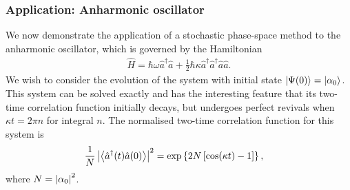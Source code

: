 
\subsubsection{Application: Anharmonic oscillator}

We now demonstrate the application of a stochastic phase-space method to the anharmonic oscillator, which is governed by the Hamiltonian
\begin{align}
    \hat{H} = \hbar \omega \hat{a}^\dagger \hat{a} + \frac{1}{2} \hbar \kappa \hat{a}^\dagger \hat{a}^\dagger \hat{a} \hat{a}. \label{BackgroundTheory:AnharmonicOscillator:Hamiltonian}
\end{align}
We wish to consider the evolution of the system with initial state ${\left|\Psi(0)\right>} = {\left|\alpha_0\right>}$.  This system can be solved exactly and has the interesting feature that its two-time correlation function initially decays, but undergoes perfect revivals when $\kappa t = 2 \pi n$ for integral $n$.  The normalised two-time correlation function for this system is
\begin{align}
    \frac{1}{N}\abs{\mean{\hat{a}^\dagger(t) \hat{a}(0)}}^2 &= \exp \left\{2 N \left[\cos(\kappa t) - 1 \right] \right\}, \label{BackgroundTheory:AnharmonicOscillator:ExactTwoTimeCorrelationFunction}
\end{align}
where $N = \left|\alpha_0\right|^2$.

